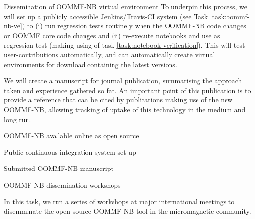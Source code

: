 \begin{workpackage}[id=dissem,wphases=18-48!.5,
  title=Dissemination,
  SARM=1,
  USORM=7]
\begin{tasklist}
\begin{task}{Dissemination of OOMMF-NB virtual environment}
  To underpin this process, we will set up a publicly accessible
  Jenkins/Travis-CI system (see Task \ref{task:oommf-nb-ve}) to (i) run regression tests routinely when
  the OOMMF-NB code changes or OOMMF core code changes and (ii)
  re-execute notebooks and use as regression test (making using of
  task \ref{task:notebook-verification}). This will test
  user-contributions automatically, and can automatically create
  virtual environments for download containing the latest versions.

  We will create a manuscript for journal publication, summarising the
  approach taken and experience gathered so far. An important point of
  this publication is to provide a reference that can be cited by
  publications making use of the new OOMMF-NB, allowing tracking of
  uptake of this technology in the medium and long run.
\end{task}
\end{tasklist}

\begin{wpdelivs}
  \begin{wpdeliv}[due=15,id=del:OOMMF-NB-opensource,dissem=??,nature=??]
      {OOMMF-NB available online as open source}
\end{wpdeliv}
  \begin{wpdeliv}[due=18,id=del:OOMMF-NB-opensource-testing,dissem=??,nature=??]
      {Public continuous integration system set up}
\end{wpdeliv}
  \begin{wpdeliv}[due=36,id=del:OOMMF-NB-opensource-manuscript,dissem=??,nature=??]
      {Submitted OOMMF-NB manuscript}
\end{wpdeliv}

\end{wpdelivs}

\begin{tasklist}
\begin{task}{OOMMF-NB dissemination workshops}
  \label{task:dissemination-of-oommf-nb-workshops}
  
  In this task, we run a series of workshops at major international
  meetings to disemminate the open source OOMMF-NB tool in the
  micromagnetic community.


\end{task}
\end{tasklist}
\end{workpackage}
